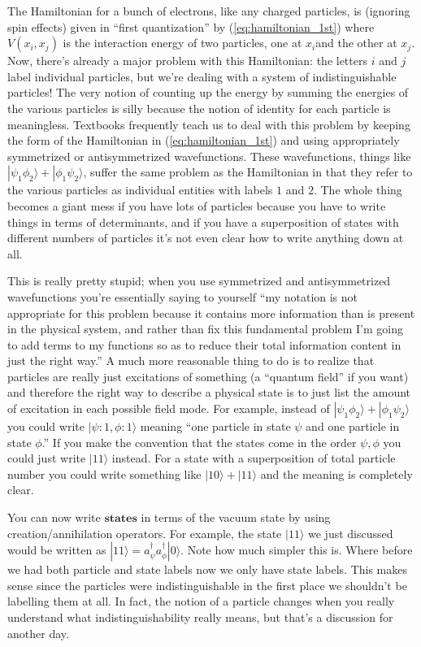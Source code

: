 \documentclass{article}
\begin{document}
The Hamiltonian for a bunch of electrons, like any charged particles,
is (ignoring spin effects) given in {}``first quantization'' by
(\ref{eq:hamiltonian_1st}) where $V(x_{i},x_{j})$ is the interaction
energy of two particles, one at $x_{i}$and the other at $x_{j}$.
Now, there's already a major problem with this Hamiltonian: the letters
$i$ and $j$ label individual particles, but we're dealing with a
system of indistinguishable particles! The very notion of counting
up the energy by summing the energies of the various particles is
silly because the notion of identity for each particle is meaningless.
Textbooks frequently teach us to deal with this problem by keeping
the form of the Hamiltonian in (\ref{eq:hamiltonian_1st}) and using
appropriately symmetrized or antisymmetrized wavefunctions. These
wavefunctions, things like $|\psi_{1}\phi_{2}\rangle+|\phi_{1}\psi_{2}\rangle$,
suffer the same problem as the Hamiltonian in that they refer to the
various particles as individual entities with labels $1$ and $2$.
The whole thing becomes a giant mess if you have lots of particles
because you have to write things in terms of determinants, and if
you have a superposition of states with different numbers of particles
it's not even clear how to write anything down at all.

This is really pretty stupid; when you use symmetrized and antisymmetrized
wavefunctions you're essentially saying to yourself {}``my notation
is not appropriate for this problem because it contains more information
than is present in the physical system, and rather than fix this fundamental
problem I'm going to add terms to my functions so as to reduce their
total information content in just the right way.'' A much more reasonable
thing to do is to realize that particles are really just excitations
of something (a {}``quantum field'' if you want) and therefore the
right way to describe a physical state is to just list the amount
of excitation in each possible field mode. For example, instead of
$|\psi_{1}\phi_{2}\rangle+|\phi_{1}\psi_{2}\rangle$ you could write
$|\psi:1,\phi:1\rangle$ meaning {}``one particle in state $\psi$
and one particle in state $\phi$.'' If you make the convention that
the states come in the order $\psi,\phi$ you could just write $|11\rangle$
instead. For a state with a superposition of total particle number
you could write something like $|10\rangle+|11\rangle$ and the meaning
is completely clear.

You can now write $\textbf{states}$ in terms of the vacuum state
by using creation/annihilation operators. For example, the state $|11\rangle$
we just discussed would be written as $|11\rangle=a_{\psi}^{\dagger}a_{\phi}^{\dagger}|0\rangle$.
Note how much simpler this is. Where before we had both particle and
state labels now we only have state labels. This makes sense since
the particles were indistinguishable in the first place we shouldn't
be labelling them at all. In fact, the notion of a particle changes
when you really understand what indistinguishability really means,
but that's a discussion for another day.
\end{document}
